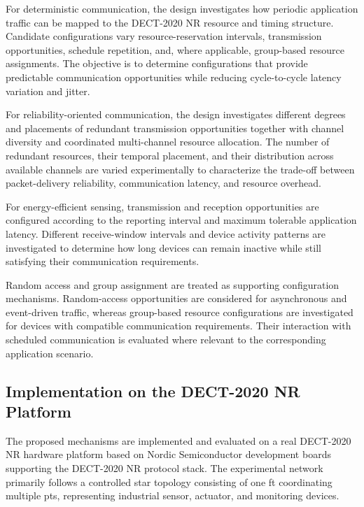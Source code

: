 \documentclass[12pt,a4paper]{article}
\begin{document}
For deterministic communication, the design investigates how periodic
application traffic can be mapped to the DECT-2020 NR resource and timing
structure. Candidate configurations vary resource-reservation intervals,
transmission opportunities, schedule repetition, and, where applicable,
group-based resource assignments. The objective is to determine configurations
that provide predictable communication opportunities while reducing
cycle-to-cycle latency variation and jitter.

For reliability-oriented communication, the design investigates different
degrees and placements of redundant transmission opportunities together with
channel diversity and coordinated multi-channel resource allocation. The
number of redundant resources, their temporal placement, and their distribution
across available channels are varied experimentally to characterize the
trade-off between packet-delivery reliability, communication latency, and
resource overhead.

For energy-efficient sensing, transmission and reception opportunities are
configured according to the reporting interval and maximum tolerable
application latency. Different receive-window intervals and device activity
patterns are investigated to determine how long devices can remain inactive
while still satisfying their communication requirements.

Random access and group assignment are treated as supporting configuration
mechanisms. Random-access opportunities are considered for asynchronous and
event-driven traffic, whereas group-based resource configurations are
investigated for devices with compatible communication requirements. Their
interaction with scheduled communication is evaluated where relevant to the
corresponding application scenario.


\subsection{Implementation on the DECT-2020 NR Platform}
\label{subsec:hardware_implementation}

The proposed mechanisms are implemented and evaluated on a real DECT-2020 NR
hardware platform based on Nordic Semiconductor development boards supporting
the DECT-2020 NR protocol stack. The experimental network primarily follows a
controlled star topology consisting of one \gls{ft} coordinating multiple
\glspl{pt}, representing industrial sensor, actuator, and monitoring devices.
\end{document}
